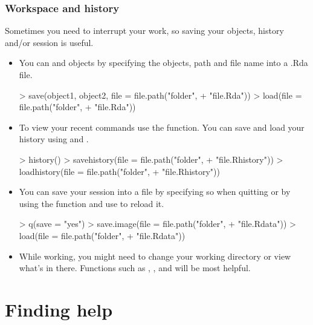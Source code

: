 \begin{frame}
  \frametitle{Workspace and history}
  Sometimes you need to interrupt your work, so saving your  objects, history and/or session is useful.
  \begin{itemize}
  \item You can  and  objects by specifying the objects, path and file name into a \alert{.Rda} file.
\begin{Schunk}
\begin{Sinput}
> save(object1, object2, file = file.path("folder", 
+     "file.Rda"))
> load(file = file.path("folder", 
+     "file.Rda"))
\end{Sinput}
\end{Schunk}
  \item To view your recent commands use the  function. You can save and load your history using  and .
\begin{Schunk}
\begin{Sinput}
> history()
> savehistory(file = file.path("folder", 
+     "file.Rhistory"))
> loadhistory(file = file.path("folder", 
+     "file.Rhistory"))
\end{Sinput}
\end{Schunk}
  \item You can save your session into a  file by specifying so when quitting or by using the  function and use  to reload it.
\begin{Schunk}
\begin{Sinput}
> q(save = "yes")
> save.image(file = file.path("folder", 
+     "file.Rdata"))
> load(file = file.path("folder", 
+     "file.Rdata"))
\end{Sinput}
\end{Schunk}
  \item While working, you might need to change your working directory or view what's in there. Functions such as , ,  and  will be most helpful.
  \end{itemize}
\end{frame}

\section{Finding help}

